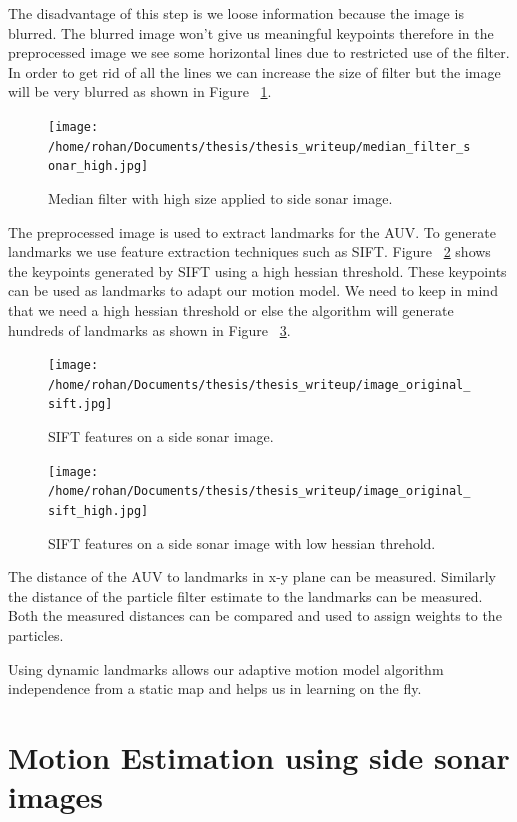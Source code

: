 \documentclass[12pt]{dalcsthesis}
\begin{document}
The disadvantage of this step is we loose information because the image is blurred. The blurred image won't give us meaningful keypoints therefore in the preprocessed image we see some horizontal lines due to restricted use of the filter. In order to get rid of all the lines we can increase the size of filter but the image will be very blurred as shown in Figure ~\ref{fig- side sonar median high}.
\begin{figure}
  \centering
     {\texttt{[image: /home/rohan/Documents/thesis/thesis\_writeup/median\_filter\_sonar\_high.jpg]}}
  \caption{\label{fig- side sonar median high} Median filter with high size applied to side sonar image.}
\end{figure}

The preprocessed image is used to extract landmarks for the AUV. To generate landmarks we use feature extraction techniques such as SIFT. Figure ~\ref{fig- side sonar sift} shows the keypoints generated by SIFT using a high hessian threshold. These keypoints can be used as landmarks to adapt our motion model. We need to keep in mind that we need a high hessian threshold or else the algorithm will generate hundreds of landmarks as shown in Figure ~\ref{fig- side sonar sift high}.
\begin{figure}
  \centering
     {\texttt{[image: /home/rohan/Documents/thesis/thesis\_writeup/image\_original\_sift.jpg]}}
  \caption{\label{fig- side sonar sift} SIFT features on a side sonar image.}
\end{figure}

\begin{figure}
  \centering
     {\texttt{[image: /home/rohan/Documents/thesis/thesis\_writeup/image\_original\_sift\_high.jpg]}}
  \caption{\label{fig- side sonar sift high} SIFT features on a side sonar image with low hessian threhold.}
\end{figure}


The distance of the AUV to landmarks in x-y plane can be measured. Similarly the distance of the particle filter estimate to the landmarks can be measured. Both the measured distances can be compared and used to assign weights to the particles. 

Using dynamic landmarks allows our adaptive motion model algorithm independence from a static map and helps us in learning on the fly.  

\section{Motion Estimation using side sonar images}
\end{document}
